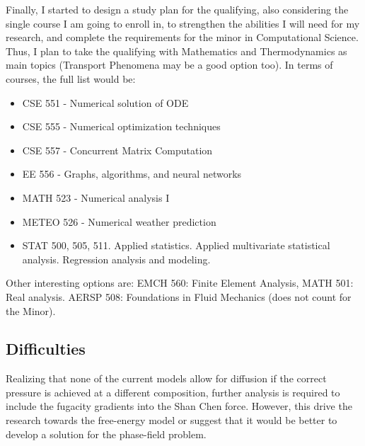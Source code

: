 \documentclass[12pt]{article}
\begin{document}
	Finally, I started to design a study plan for the qualifying, also considering the single course I am going to enroll in, to strengthen the abilities I will need for my research, and complete the requirements for the minor in Computational Science. Thus, I plan to take the qualifying with Mathematics and Thermodynamics as main topics (Transport Phenomena may be a good option too). In terms of courses, the full list would be:
	
	\begin{itemize}[nosep]
		\item CSE 551 - Numerical solution of ODE
		\item CSE 555 - Numerical optimization techniques
		\item CSE 557 - Concurrent Matrix Computation
		\item EE 556 - Graphs, algorithms, and neural networks
		\item MATH 523 - Numerical analysis I
		\item METEO 526 - Numerical weather prediction
		\item STAT 500, 505, 511. Applied statistics. Applied multivariate statistical analysis. Regression analysis and modeling. 
	\end{itemize}
	Other interesting options are: EMCH 560: Finite Element Analysis, MATH 501: Real analysis. AERSP 508: Foundations in Fluid Mechanics (does not count for the Minor).
	
	\subsection*{Difficulties}
	Realizing that none of the current models allow for diffusion if the correct pressure is achieved at a different composition, further analysis is required to include the fugacity gradients into the Shan Chen force. However, this drive the research towards the free-energy model or suggest that it would be better to develop a solution for the phase-field problem.
	
\end{document}
